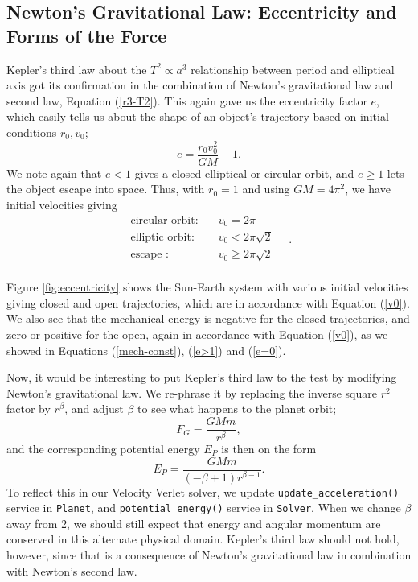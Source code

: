 \documentclass[]{article}
\begin{document}
\subsection{Newton's Gravitational Law: Eccentricity and Forms of the Force}
Kepler's third law about the $T^2 \propto a^3$ relationship between period and elliptical axis got its confirmation in the combination of Newton's gravitational law and second law, Equation (\ref{r3-T2}). This again gave us the eccentricity factor $e$, which easily tells us about the shape of an object's trajectory based on initial conditions $r_0, v_0$;
\begin{equation}
	e = \frac{r_0 v_0^2}{GM} - 1.
\end{equation}
We note again that $e<1$ gives a closed elliptical or circular orbit, and $e \ge 1$ lets the object escape into space. Thus, with $r_0 = 1$ and using $GM = 4 \pi^2$, we have initial velocities giving
\begin{equation} \label{v0}
\begin{aligned}
	\text{circular orbit:}& \quad v_0 = 2 \pi \\
	\text{elliptic orbit:}& \quad v_0 < 2 \pi \sqrt{2} \\
	\text{escape :}& \quad v_0 \ge 2 \pi \sqrt{2} \\
\end{aligned} \quad.
\end{equation}

Figure \ref{fig:eccentricity} shows the Sun-Earth system with various initial velocities giving closed and open trajectories, which are in accordance with Equation (\ref{v0}). We also see that the mechanical energy is negative for the closed trajectories, and zero or positive for the open, again in accordance with Equation (\ref{v0}), as we showed in Equations (\ref{mech-const}), (\ref{e>1}) and (\ref{e=0}).

Now, it would be interesting to put Kepler's third law to the test by modifying Newton's gravitational law. We re-phrase it by replacing the inverse square $r^2$ factor by $r^{\beta}$, and adjust $\beta$ to see what happens to the planet orbit;
\begin{equation}
	F_G = \frac{GMm}{r^{\beta}},
\end{equation}
and the corresponding potential energy $E_P$ is then on the form
\begin{equation} \label{newton-grav-alt}
	E_P = \frac{GMm}{(-\beta+1)r^{\beta-1}}.
\end{equation}
To reflect this in our Velocity Verlet solver, we update \lstinline|update_acceleration()| service in \lstinline|Planet|, and  \lstinline|potential_energy()| service in \lstinline|Solver|. When we change $\beta$ away from 2, we should still expect that energy and angular momentum are conserved in this alternate physical domain. Kepler's third law should not hold, however, since that is a consequence of Newton's gravitational law in combination with Newton's second law. 
\end{document}
